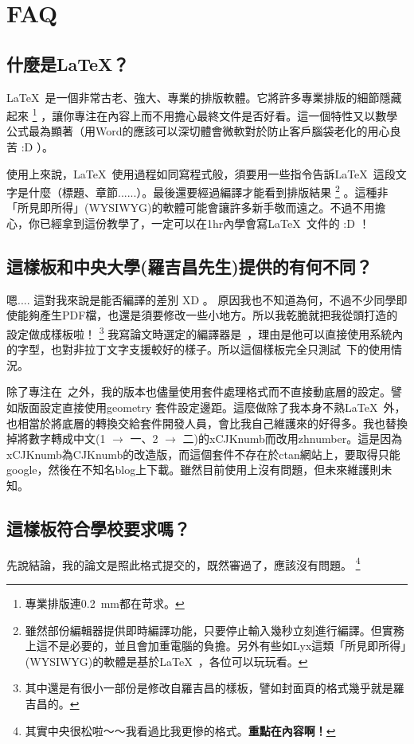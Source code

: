 \documentclass[class=NCU_thesis, crop=false, float=true]{standalone}
\begin{document}

\let\orilabel\label %

\chapter{FAQ}
\label{sec:c_faq}
\section{什麼是\LaTeX ？}
\LaTeX\  是一個非常古老、強大、專業的排版軟體。它將許多專業排版的細節隱藏起來
\footnote{專業排版連\SI{0.2}{\milli\metre}都在苛求。}
，讓你專注在內容上而不用擔心最終文件是否好看。這一個特性又以數學公式最為顯著（用Word的應該可以深切體會微軟對於防止客戶腦袋老化的用心良苦 :D ）。

使用上來說，\LaTeX\ 使用過程如同寫程式般，須要用一些指令告訴\LaTeX\ 這段文字是什麼（標題、章節......）。最後還要經過編譯才能看到排版結果
\footnote{雖然部份編輯器提供即時編譯功能，只要停止輸入幾秒立刻進行編譯。但實務上這不是必要的，並且會加重電腦的負擔。另外有些如Lyx這類「所見即所得」(WYSIWYG)的軟體是基於\LaTeX\ ，各位可以玩玩看。}
。這種非「所見即所得」(WYSIWYG)的軟體可能會讓許多新手敬而遠之。不過不用擔心，你已經拿到這份教學了，一定可以在1hr內學會寫\LaTeX\ 文件的 :D ！

\section{這樣板和中央大學(羅吉昌先生)提供的有何不同？}
嗯.... 這對我來說是能否編譯的差別 XD 。 原因我也不知道為何，不過不少同學即使能夠產生PDF檔，也還是須要修改一些小地方。所以我乾脆就把我從頭打造的設定做成樣板啦！
\footnote{其中還是有很小一部份是修改自羅吉昌的樣板，譬如封面頁的格式幾乎就是羅吉昌的。}
我寫論文時選定的編譯器是\XeLaTeX\  ，理由是他可以直接使用系統內的字型，也對非拉丁文字支援較好的樣子。所以這個樣板完全只測試\XeLaTeX\ 下的使用情況。

除了專注在\XeLaTeX\ 之外，我的版本也儘量使用套件處理格式而不直接動底層的設定。譬如版面設定直接使用geometry 套件設定邊距。這麼做除了我本身不熟\LaTeX\ 外，也相當於將底層的轉換交給套件開發人員，會比我自己維護來的好得多。我也替換掉將數字轉成中文(1 $\rightarrow$ 一、2 $\rightarrow$ 二)的xCJKnumb而改用zhnumber。這是因為xCJKnumb為CJKnumb的改造版，而這個套件不存在於ctan網站上，要取得只能google，然後在不知名blog上下載。雖然目前使用上沒有問題，但未來維護則未知。

\section{這樣板符合學校要求嗎？}
先說結論，我的論文是照此格式提交的，既然審過了，應該沒有問題。
\footnote{其實中央很松啦～～我看過比我更慘的格式。\textbf{重點在內容啊！}}
\end{document}
